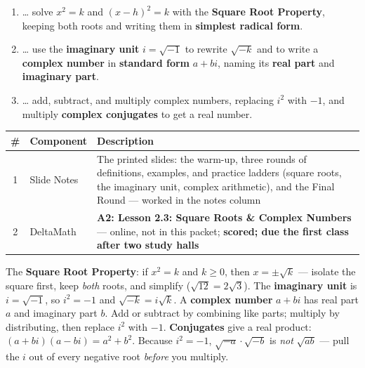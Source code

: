 \documentclass[12pt]{article}
\begin{document}

\namedateperiod
\vspace{0.18in}

\boxguard[14]
\begin{learningtargetbox}
\small
\begin{enumerate}[leftmargin=1.5em, itemsep=5pt]
  \item \ldots{} solve $x^2=k$ and $(x-h)^2=k$ with the \textbf{Square Root Property}, keeping
        both roots and writing them in \textbf{simplest radical form}.
  \item \ldots{} use the \textbf{imaginary unit} $i=\sqrt{-1}$ to rewrite $\sqrt{-k}$ and to write
        a \textbf{complex number} in \textbf{standard form} $a+bi$, naming its \textbf{real part}
        and \textbf{imaginary part}.
  \item \ldots{} add, subtract, and multiply complex numbers, replacing $i^2$ with $-1$, and
        multiply \textbf{complex conjugates} to get a real number.
\end{enumerate}
\end{learningtargetbox}

\vspace{0.14in}

\boxguard[14]
\begin{tocbox}
\small
\renewcommand{\arraystretch}{1.5}
\begin{tabularx}{\linewidth}{@{} c l X @{}}
\rowcolor{forestbg}
\textbf{\#} & \textbf{Component} & \textbf{Description} \\
\midrule
1 & Slide Notes & The printed slides: the warm-up, three rounds of definitions, examples, and
                  practice ladders (square roots, the imaginary unit, complex arithmetic), and
                  the Final Round --- worked in the notes column \\
2 & DeltaMath   & \textbf{A2: Lesson 2.3: Square Roots \& Complex Numbers} --- online, not in this packet;
                  \textbf{scored; due the first class after two study halls} \\
\end{tabularx}
\end{tocbox}

\vspace{0.14in}

\boxguard[8]
\begin{remindbox}
\small
The \textbf{Square Root Property}: if $x^2=k$ and $k\ge0$, then $x=\pm\sqrt{k}$ --- isolate the
square first, keep \emph{both} roots, and simplify ($\sqrt{12}=2\sqrt3$). The \textbf{imaginary
unit} is $i=\sqrt{-1}$, so $i^2=-1$ and $\sqrt{-k}=i\sqrt{k}$. A \textbf{complex number} $a+bi$
has real part $a$ and imaginary part $b$. Add or subtract by combining like parts; multiply by
distributing, then replace $i^2$ with $-1$. \textbf{Conjugates} give a real product:
$(a+bi)(a-bi)=a^2+b^2$. Because $i^2=-1$, $\sqrt{-a}\cdot\sqrt{-b}$ is \emph{not} $\sqrt{ab}$ ---
pull the $i$ out of every negative root \emph{before} you multiply.
\end{remindbox}
\end{document}
